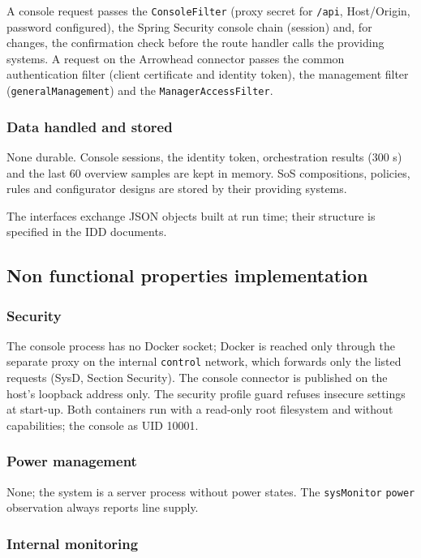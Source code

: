 \documentclass[a4paper]{arrowhead}
\begin{document}
A console request passes the \texttt{ConsoleFilter} (proxy secret for \texttt{/api}, Host/Origin, password configured), the Spring Security console chain (session) and, for changes, the confirmation check before the route handler calls the providing systems. A request on the Arrowhead connector passes the common authentication filter (client certificate and identity token), the management filter (\texttt{general\allowbreak{}Management}) and the \texttt{ManagerAccessFilter}.

\subsubsection{Data handled and stored}

None durable. Console sessions, the identity token, orchestration results (300 s) and the last 60 overview samples are kept in memory. SoS compositions, policies, rules and configurator designs are stored by their providing systems.

The interfaces exchange JSON objects built at run time; their structure is specified in the IDD documents.

\subsection{Non functional properties implementation}

\subsubsection{Security}

The console process has no Docker socket; Docker is reached only through the separate proxy on the internal \texttt{control} network, which forwards only the listed requests (SysD, Section Security). The console connector is published on the host's loopback address only. The security profile guard refuses insecure settings at start-up. Both containers run with a read-only root filesystem and without capabilities; the console as UID 10001.

\subsubsection{Power management}

None; the system is a server process without power states. The \texttt{sysMonitor} \texttt{power} observation always reports line supply.

\subsubsection{Internal monitoring}
\end{document}
